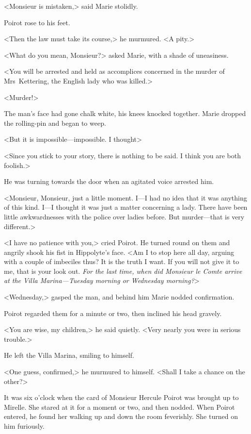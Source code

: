 <Monsieur is mistaken,> said Marie stolidly.

Poirot rose to his feet.

<Then the law must take its course,> he murmured. <A pity.>

<What do you mean, Monsieur?> asked Marie, with a shade of uneasiness.

<You will be arrested and held as accomplices concerned in the murder of Mrs~Kettering, the English lady who was killed.>

<Murder!>

The man's face had gone chalk white, his knees knocked together. Marie dropped the rolling-pin and began to weep.

<But it is impossible—impossible. I thought\longdash>

<Since you stick to your story, there is nothing to be said. I think you are both foolish.>

He was turning towards the door when an agitated voice arrested him.

<Monsieur, Monsieur, just a little moment. I—I had no idea that it was anything of this kind. I—I thought it was just a matter concerning a lady. There have been little awkwardnesses with the police over ladies before. But murder—that is very different.>

<I have no patience with you,> cried Poirot. He turned round on them and angrily shook his fist in Hippolyte's face. <Am I to stop here all day, arguing with a couple of imbeciles thus? It is the truth I want. If you will not give it to me, that is your look out. \emph{For the last time, when did Monsieur le Comte arrive at the Villa Marina—Tuesday morning or Wednesday morning?}>

<Wednesday,> gasped the man, and behind him Marie nodded confirmation.

Poirot regarded them for a minute or two, then inclined his head gravely.

<You are wise, my children,> he said quietly. <Very nearly you were in serious trouble.>

He left the Villa Marina, smiling to himself.

<One guess, confirmed,> he murmured to himself. <Shall I take a chance on the other?>

It was six o'clock when the card of Monsieur Hercule Poirot was brought up to Mirelle. She stared at it for a moment or two, and then nodded. When Poirot entered, he found her walking up and down the room feverishly. She turned on him furiously.

